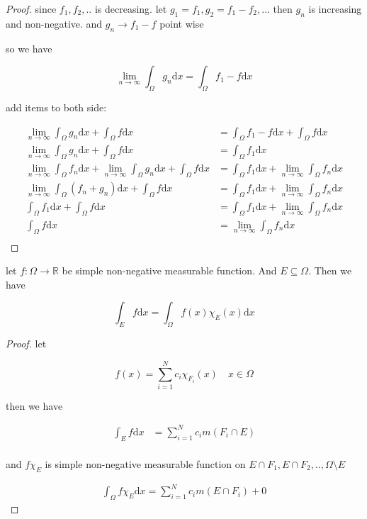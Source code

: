 \documentclass[11pt,a4paper]{article}
\begin{document}
\begin{proof}
    since $f_1, f_2, .. $ is decreasing. let $g_1 = f_1, g_2 = f_1 - f_2, ..$. then $g_n$ is increasing and non-negative. and $g_n \to f_1 - f$ point wise

    so we have

    \[
        \lim_{n \to \infty}\int_{\Omega}g_n \mathrm{d}x = \int_{\Omega}f_1 - f \mathrm{d}x
    \]


    add items to both side:

    \begin{align*}
        \lim_{n \to \infty}\int_{\Omega}g_n \mathrm{d}x + \int_{\Omega}f \mathrm{d}x &= \int_{\Omega}f_1 - f \mathrm{d}x + \int_{\Omega}f \mathrm{d}x \\
        \lim_{n \to \infty}\int_{\Omega}g_n \mathrm{d}x + \int_{\Omega}f \mathrm{d}x &= \int_{\Omega}f_1 \mathrm{d}x \\
        \lim_{n \to \infty}\int_{\Omega}f_n \mathrm{d}x + \lim_{n \to \infty}\int_{\Omega}g_n \mathrm{d}x + \int_{\Omega}f \mathrm{d}x &= \int_{\Omega}f_1 \mathrm{d}x + \lim_{n \to \infty}\int_{\Omega}f_n \mathrm{d}x\\
        \lim_{n \to \infty}\int_{\Omega}\left(f_n + g_n\right) \mathrm{d}x  + \int_{\Omega}f \mathrm{d}x &= \int_{\Omega}f_1 \mathrm{d}x + \lim_{n \to \infty}\int_{\Omega}f_n \mathrm{d}x\\ 
        \int_{\Omega}f_1 \mathrm{d}x + \int_{\Omega}f \mathrm{d}x &= \int_{\Omega}f_1 \mathrm{d}x + \lim_{n \to \infty}\int_{\Omega}f_n \mathrm{d}x \\
        \int_{\Omega}f \mathrm{d}x &= \lim_{n \to \infty}\int_{\Omega}f_n \mathrm{d}x \\
    \end{align*}
\end{proof}

\begin{exercise}
    let $f: \Omega \to \mathbb{R}$ be simple non-negative measurable function. And $E \subseteq \Omega$. Then we have

    \[
        \int_{E} f \mathrm{d}x = \int_{\Omega} f(x)\chi_{E}(x) \mathrm{d}x
    \]
\end{exercise}

\begin{proof}
   let 
   
   \[
    f(x) = \sum_{i=1}^{N}c_i \chi_{F_i}(x) \quad x \in \Omega
   \]


   then we have

   \begin{align*}
    \int_{E}f \mathrm{d}x &= \sum_{i=1}^{N} c_i m(F_i \cap E) \\
   \end{align*}

   and $f \chi_{E}$ is simple non-negative measurable function on $E \cap F_1, E \cap F_2, .., \Omega \setminus E$

   \begin{align*}
    \int_{\Omega}f \chi_{E} \mathrm{d}x  = \sum_{i=1}^{N} c_i m(E \cap F_i) + 0
   \end{align*}
\end{proof}
\end{document}
